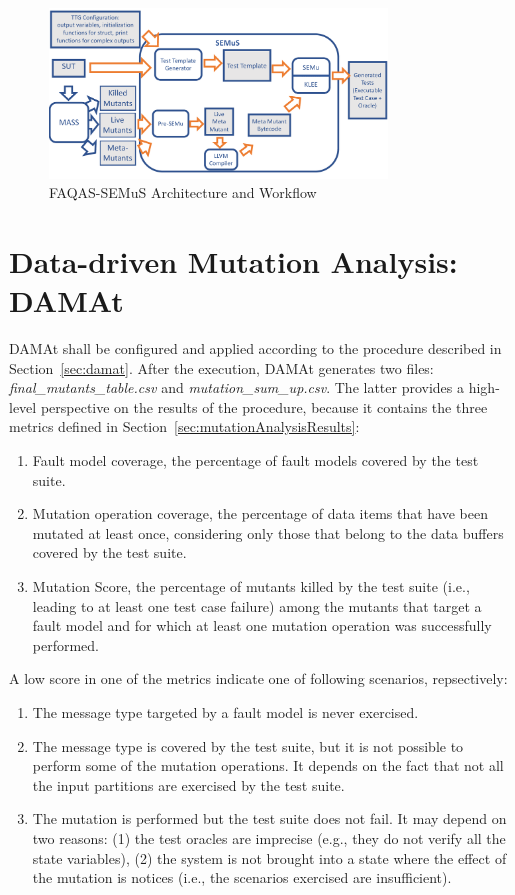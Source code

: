 \begin{figure}[h]
\begin{center}
\includegraphics[width=0.8\textwidth]{images/semus-architecture2}
\caption{FAQAS-SEMuS Architecture and Workflow}
\label{fig:semus_architecture}
\end{center}
\end{figure}

\clearpage
\section{Data-driven Mutation Analysis: DAMAt}
\label{sec:meth:damat}

DAMAt shall be configured and applied according to the procedure described in Section~\ref{sec:damat}.
After the execution, DAMAt generates two files: \emph{final\_mutants\_table.csv} and \emph{mutation\_sum\_up.csv}.
The latter provides a high-level perspective on the results of the procedure, because it contains the three metrics defined in Section~\ref{sec:mutationAnalysisResults}:
\begin{enumerate}
\item Fault model coverage, the percentage of fault models covered by the test suite.
\item Mutation operation coverage, the percentage of data items that have been mutated at least once, considering only those that belong to the data buffers covered by the test suite.
\item Mutation Score, the percentage of mutants killed by the test suite (i.e., leading to at least one test case failure) among the mutants that target a fault model and for which at least one mutation operation was successfully performed.
\end{enumerate}
 

A low score in one of the metrics indicate one of following scenarios, repsectively:
\begin{enumerate}
\item The message type targeted by a fault model is never exercised.
\item The message type is covered by the test suite, but it is not possible to perform some of the mutation operations. It depends on the fact that not all the input partitions are exercised by the test suite.
\item The mutation is performed but the test suite does not fail. It may depend on two reasons: (1) the test oracles are imprecise (e.g., they do not verify all the state variables), (2) the system is not brought into a state where the effect of the mutation is notices (i.e., the scenarios exercised are insufficient).
\end{enumerate}
 

